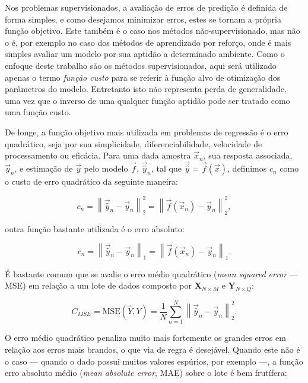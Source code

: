     Nos problemas supervisionados, a avaliação de erros de predição é definida de forma simples, e como desejamos minimizar erros, estes se tornam a própria função objetivo. Este também é o caso nos métodos não-supervisionado, mas não o é, por exemplo no caso dos métodos de aprendizado por reforço, onde é mais simples avaliar um modelo por sua aptidão a determinado ambiente. Como o enfoque deste trabalho são os métodos supervisionados, aqui será utilizado apenas o termo \emph{função custo} para se referir à função alvo de otimização dos parâmetros do modelo. Entretanto isto não representa perda de generalidade, uma vez que o inverso de uma qualquer função aptidão pode ser tratado como uma função custo.

    De longe, a função objetivo mais utilizada em problemas de regressão é o erro quadrático, seja por sua simplicidade, diferenciabilidade, velocidade de processamento ou eficácia. Para uma dada amostra $\vec{x}_n$, sua resposta associada, $\vec{y}_n$, e estimação de $\vec{y}$ pelo modelo $\vec{f}$, $\vec{\hat{y}}_n$, tal que $\vec{\hat{y}} = \vec{f}(\vec{x})$, definimos $c_n$ como o custo de erro quadrático da seguinte maneira:

    \begin{equation} \label{e:c_se_n}
      c_n =
      \left\| \vec{\hat{y}}_n - \vec{y}_n \right\|_2^2 =
      \left\| \vec{f}(\vec{x}_n) - \vec{y}_n \right\|_2^2
      ,
    \end{equation}

    \noindent outra função bastante utilizada é o erro absoluto:

    \begin{equation} \label{e:c_ae_n}
      c_n =
      \left\| \vec{\hat{y}}_n - \vec{y}_n \right\|_1 =
      \left\| \vec{f}(\vec{x}_n) - \vec{y}_n \right\|_1
      .
    \end{equation}

    \DIFdelbegin %
\DIFdelend É bastante comum que se avalie o erro médio quadrático (\textit{mean squared error} --- MSE) em relação a um lote de dados composto por $\boldsymbol{X}_{N\times M}$ e $\boldsymbol{Y}_{N\times Q}$:

    \begin{equation} \label{e:c_mse}
      C_{MSE} =
      \text{MSE}\left(\hat{Y}, Y\right) =
      \frac{1}{N} \sum \limits_{n=1}^N \left\| \vec{\hat{y}}_n - \vec{y}_n \right\|_2^2
      .
    \end{equation}

    O erro médio quadrático penaliza muito mais fortemente os grandes erros em relação aos erros mais brandos, o que via de regra é desejável. Quando este não é o caso --- quando o dado possui muitos valores espúrios, por exemplo ---, a função erro absoluto médio (\textit{mean absolute error}, MAE) sobre o lote é bem frutífera:

